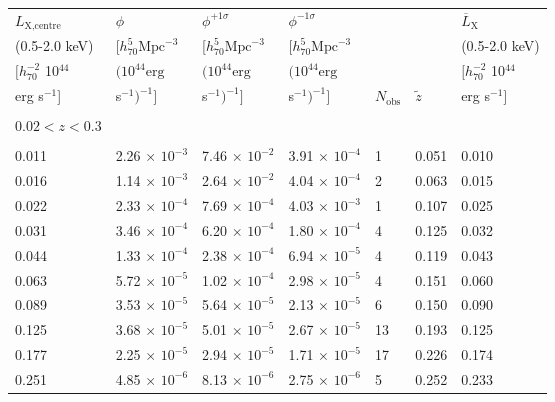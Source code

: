 \begin{tabular}{lllllll}\\ \hline
$L_\text{X,centre}$             & $\phi$                                        & $\phi^{+1\sigma}$                 & $\phi^{-1\sigma}$                  & {}                 & & $\overline{L}_\text{X}$ \\
(0.5-2.0 keV)                        & [$h_{70}^5 \text{Mpc}^{-3}$  & [$h_{70}^5 \text{Mpc}^{-3}$ & [$h_{70}^5 \text{Mpc}^{-3}$ & {}                 & & (0.5-2.0 keV) \\
$[h_{70}^{-2}$ 10$^{44}$  & $(10^{44} \text{erg}$              & $(10^{44} \text{erg}$             & $(10^{44} \text{erg}$             & {}                 & & $[h_{70}^{-2}$ 10$^{44}$ \\
erg s$^{-1}$]                         &  s$^{-1})^{-1}]$                        &  s$^{-1})^{-1}]$                      &  s$^{-1})^{-1}]$                        & $N_\text{obs}$ & $\tilde{z}$ & erg s$^{-1}]$  \\
 \hline\hline
\\
$0.02<z<0.3$ \\
\\ 
0.011 & 2.26 $\times$ $10^{-3}$ & 7.46 $\times$ $10^{-2}$ & 3.91 $\times$ $10^{-4}$ & 1 & 0.051 & 0.010 \\
0.016 & 1.14 $\times$ $10^{-3}$ & 2.64 $\times$ $10^{-2}$ & 4.04 $\times$ $10^{-4}$ & 2 & 0.063 & 0.015 \\
0.022 & 2.33 $\times$ $10^{-4}$ & 7.69 $\times$ $10^{-4}$ & 4.03 $\times$ $10^{-3}$ & 1 & 0.107 & 0.025 \\
0.031 & 3.46 $\times$ $10^{-4}$ & 6.20 $\times$ $10^{-4}$ & 1.80 $\times$ $10^{-4}$ & 4 & 0.125 & 0.032 \\
0.044 & 1.33 $\times$ $10^{-4}$ & 2.38 $\times$ $10^{-4}$ & 6.94 $\times$ $10^{-5}$ & 4 & 0.119 & 0.043 \\
0.063 & 5.72 $\times$ $10^{-5}$ & 1.02 $\times$ $10^{-4}$ & 2.98 $\times$ $10^{-5}$ & 4 & 0.151 & 0.060 \\
0.089 & 3.53 $\times$ $10^{-5}$ & 5.64 $\times$ $10^{-5}$ & 2.13 $\times$ $10^{-5}$ & 6 & 0.150	& 0.090 \\
0.125 & 3.68 $\times$ $10^{-5}$ & 5.01 $\times$ $10^{-5}$ & 2.67 $\times$ $10^{-5}$ & 13 & 0.193 & 0.125 \\
0.177 & 2.25 $\times$ $10^{-5}$ & 2.94 $\times$ $10^{-5}$ & 1.71 $\times$ $10^{-5}$ & 17 & 0.226 & 0.174 \\
0.251 & 4.85 $\times$ $10^{-6}$ & 8.13 $\times$ $10^{-6}$ & 2.75 $\times$ $10^{-6}$ & 5 & 0.252 & 0.233 \\

\end{tabular}
